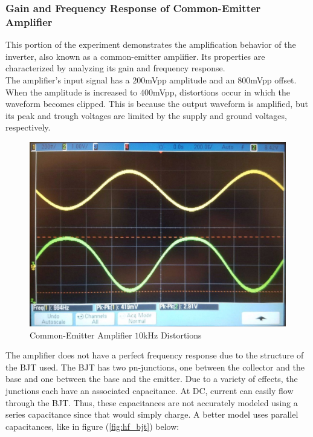 \subsubsection{Gain and Frequency Response of Common-Emitter Amplifier}
This portion of the experiment demonstrates the amplification behavior of the inverter, also known as a common-emitter amplifier. Its properties are characterized by analyzing its gain and frequency response. \\
The amplifier's input signal has a $200$\si{\milli\volt}pp amplitude and an $800$\si{\milli\volt}pp offset.
When the amplitude is increased to $400$\si{\milli\volt}pp, distortions occur in which the waveform becomes clipped. This is because the output waveform is amplified, but its peak and trough voltages are limited by the supply and ground voltages, respectively.
\FloatBarrier
\begin{figure}[h!]
	\centering
	\includegraphics[scale=0.25]{./images/amplifier_10ghz_clamping.jpeg}
	\caption{Common-Emitter Amplifier $10$\si{\kilo\hertz} Distortions}
	\label{fig:clamping}
\end{figure}
\FloatBarrier
The amplifier does not have a perfect frequency response due to the structure of the BJT used. The BJT has two pn-junctions, one between the collector and the base and one between the base and the emitter. Due to a variety of effects, the junctions each have an associated capacitance. At DC, current can easily flow through the BJT. Thus, these capacitances are not accurately modeled using a series capacitance since that would simply charge. A better model uses parallel capacitances, like in figure (\ref{fig:hf_bjt}) below:

